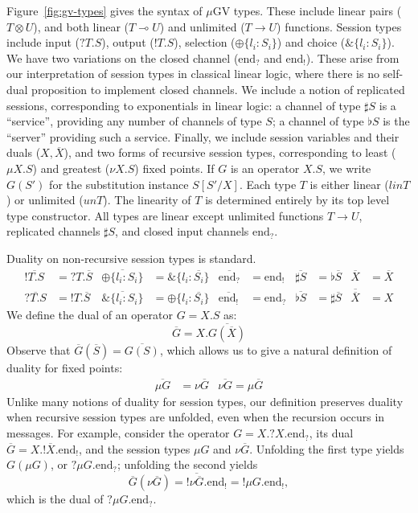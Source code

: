 \documentclass[orivec,envcountsame]{llncs}
\newcommand{\with}{\mathbin\binampersand}
\newcommand{\gvdual}[1]{\overline{#1}}
\newcommand{\gvout}[2]{{!#1.#2}}
\newcommand{\gvin}[2]{{?#1.#2}}
\newcommand{\lto}{\ensuremath{\multimap}}
\newcommand{\uto}{\ensuremath{\rightarrow}}
\newcommand{\outterm}{\mathrm{end}_!}
\newcommand{\interm}{\mathrm{end}_?}
\newcommand{\gvserver}[1]{\flat #1}
\newcommand{\gvservice}[1]{\sharp #1}
\newcommand{\un}{un}
\newcommand{\lin}{lin}
\newcommand{\mugv}{$\mu\mathrm{GV}$\xspace}
\begin{document}
Figure~\ref{fig:gv-types} gives the syntax of \mugv types. These include linear pairs ($T \otimes
U$), and both linear ($T \lto U$) and unlimited ($T \uto U$) functions. Session types include input
($\gvin{T}{S}$), output ($\gvout{T}{S}$), selection ($\oplus\{ l_i:S_i \}$) and choice
($\with\{l_i:S_i\}$). We have two variations on the closed channel ($\interm$ and $\outterm$). These
arise from our interpretation of session types in classical linear logic, where there is no
self-dual proposition to implement closed channels. We include a notion of replicated sessions,
corresponding to exponentials in linear logic: a channel of type $\gvservice{S}$ is a ``service'',
providing any number of channels of type $S$; a channel of type $\gvserver{S}$ is the ``server''
providing such a service. Finally, we include session variables and their duals ($X,\gvdual{X}$),
and two forms of recursive session types, corresponding to least ($\mu X.S$) and greatest ($\nu
X.S$) fixed points. If $G$ is an operator $X.S$, we write $G(S')$ for the substitution instance
$S[S'/X]$.
%
Each type $T$ is either linear ($\lin{T}$) or unlimited ($\un{T}$). The linearity of $T$ is
determined entirely by its top level type constructor.
%
All types are linear except unlimited functions $T \uto U$, replicated channels $\gvservice{S}$, and
closed input channels $\interm$.

Duality on non-recursive session types is standard.
{\small\begin{align*}
\gvdual{\gvout{T}{S}} &= \gvin{T}{\gvdual{S}} &
  \gvdual{\oplus \{ l_i: S_i \}} &= \with \{ l_i : \gvdual{S_i} \} &
  \gvdual{\interm} &= \outterm &
  \gvdual{\gvservice{S}} &= \gvserver{\gvdual{S}} &
  \gvdual{X} &= \gvdual{X} \\
\gvdual{\gvin{T}{S}} &= \gvout{T}{\gvdual{S}} &
  \gvdual{\with \{ l_i: S_i \}} &= \oplus \{ l_i : \gvdual{S_i} \} &
  \gvdual{\outterm} &= \interm &
  \gvdual{\gvserver{S}} &= \gvservice{\gvdual{S}} &
  \gvdual{\gvdual{X}} &= X
\end{align*}}%
We define the dual of an operator $G = X.S$ as:
\[
\gvdual{G} = X.\gvdual{G(\gvdual{X})}
\]%
%
Observe that $\gvdual{G}(\gvdual{S}) = \gvdual{G(S)}$, which allows us to
give a natural definition of duality for fixed points:
%
{\small\begin{align*}
\gvdual{\mu G} &= \nu \gvdual{G} & \gvdual{\nu G} = \mu \gvdual{G}
\end{align*}}%
Unlike many notions of duality for session types, our definition preserves duality when recursive
session types are unfolded, even when the recursion occurs in messages.  For example, consider the
operator $G = X.\gvin{X}{\interm}$, its dual $\gvdual{G} = X.\gvout{\gvdual{X}}{\outterm}$, and the
session types $\mu G$ and $\nu \gvdual{G}$.  Unfolding the first type yields $G(\mu G)$, or
$\gvin{\mu G}{\interm}$; unfolding the second yields {\small\[ \gvdual{G}(\nu \gvdual{G}) =
  \gvout{\gvdual{\nu \gvdual{G}}}{\outterm} = \gvout{\mu G}{\outterm},
\]}%
which is the dual of $\gvin{\mu G}{\interm}$.
\end{document}

